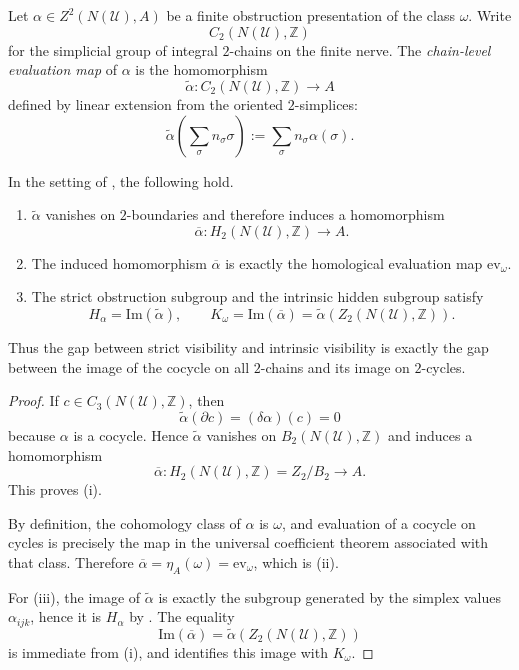\begin{definition}\label{def:chain-level-evaluation}
Let $\alpha\in Z^2(N(\mathcal U),A)$ be a finite obstruction presentation of the class $\omega$. Write
\[
C_2(N(\mathcal U),\mathbb Z)
\]
for the simplicial group of integral $2$-chains on the finite nerve. The \emph{chain-level evaluation map} of $\alpha$ is the homomorphism
\[
\widetilde\alpha:C_2(N(\mathcal U),\mathbb Z)\to A
\]
defined by linear extension from the oriented $2$-simplices:
\[
\widetilde\alpha\!\left(\sum_{\sigma} n_{\sigma}\sigma\right)
:=
\sum_{\sigma} n_{\sigma}\alpha(\sigma).
\]
\end{definition}

\begin{proposition}\label{prop:chain-vs-homological-visibility}
In the setting of , the following hold.
\begin{enumerate}[label=(\roman*),nosep]
\item $\widetilde\alpha$ vanishes on $2$-boundaries and therefore induces a homomorphism
\[
\overline\alpha:H_2(N(\mathcal U),\mathbb Z)\to A.
\]
\item The induced homomorphism $\overline\alpha$ is exactly the homological evaluation map $\mathrm{ev}_{\omega}$.
\item The strict obstruction subgroup and the intrinsic hidden subgroup satisfy
\[
H_\alpha=\mathrm{Im}(\widetilde\alpha),
\qquad
K_{\omega}=\mathrm{Im}(\overline\alpha)=\widetilde\alpha(Z_2(N(\mathcal U),\mathbb Z)).
\]
\end{enumerate}
Thus the gap between strict visibility and intrinsic visibility is exactly the gap between the image of the cocycle on all $2$-chains and its image on $2$-cycles.
\end{proposition}

\begin{proof}
If $c\in C_3(N(\mathcal U),\mathbb Z)$, then
\[
\widetilde\alpha(\partial c)=(\delta\alpha)(c)=0
\]
because $\alpha$ is a cocycle. Hence $\widetilde\alpha$ vanishes on $B_2(N(\mathcal U),\mathbb Z)$ and induces a homomorphism
\[
\overline\alpha:H_2(N(\mathcal U),\mathbb Z)=Z_2/B_2\to A.
\]
This proves \textup{(i)}.

By definition, the cohomology class of $\alpha$ is $\omega$, and evaluation of a cocycle on cycles is precisely the map in the universal coefficient theorem associated with that class. Therefore $\overline\alpha=\eta_A(\omega)=\mathrm{ev}_{\omega}$, which is \textup{(ii)}.

For \textup{(iii)}, the image of $\widetilde\alpha$ is exactly the subgroup generated by the simplex values $\alpha_{ijk}$, hence it is $H_\alpha$ by . The equality
\[
\mathrm{Im}(\overline\alpha)=\widetilde\alpha(Z_2(N(\mathcal U),\mathbb Z))
\]
is immediate from \textup{(i)}, and  identifies this image with $K_{\omega}$.
\end{proof}

